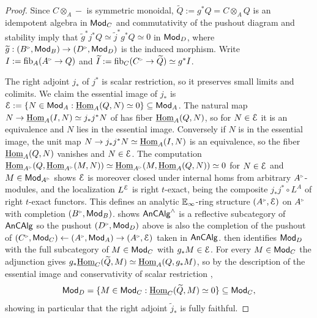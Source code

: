 \begin{proof}
    Since $C\otimes_{A}-$ is symmetric monoidal, $\widetilde{Q}:=g^{*}Q=C\otimes_{A}Q$ is an idempotent algebra in $\mathsf{Mod}_{C}$ and commutativity of the pushout diagram and stability imply that $\widetilde{g}^{*}j^{*}Q\simeq\widetilde{j}^{*}g^{*}Q\simeq0$ in $\mathsf{Mod}_{D}$, where $\widetilde{g}:(B^{\tri},\Mod_{B})\to(D^{\tri},\Mod_{D})$ is the induced morphism. Write $I:=\fib_{A}(A^{\tri}\to Q)$ and $\widetilde{I}:=\fib_{C}(C^{\tri}\to\widetilde{Q})\simeq g^{*}I$.

    The right adjoint $j_{*}$ of $j^{*}$ is scalar restriction, so it preserves small limits and colimits. We claim the essential image of $j_{*}$ is $\EuScript{E}:=\{N\in\mathsf{Mod}_{A}:\underline{\mathrm{Hom}}_{A}(Q,N)\simeq0\}\subseteq\mathsf{Mod}_{A}$. The natural map $N\to\underline{\mathrm{Hom}}_{A}(I,N)\simeq j_{*}j^{*}N$ of \cite[Rmk. 5.1.5 (2)]{CamargoSolid} has fiber $\underline{\mathrm{Hom}}_{A}(Q,N)$, so for $N\in\EuScript{E}$ it is an equivalence and $N$ lies in the essential image. Conversely if $N$ is in the essential image, the unit map $N\to j_{*}j^{*}N\simeq\underline{\mathrm{Hom}}_{A}(I,N)$ is an equivalence, so the fiber $\underline{\mathrm{Hom}}_{A}(Q,N)$ vanishes and $N\in\EuScript{E}$. The computation $\intHom_{A^{\tri}}(Q,\intHom_{A^{\tri}}(M,N))\simeq\intHom_{A^{\tri}}(M,\intHom_{A}(Q,N))\simeq0$ for $N\in\EuScript{E}$ and $M\in\Mod_{A^{\tri}}$ shows $\EuScript{E}$ is moreover closed under internal homs from arbitrary $A^{\tri}$-modules, and the localization $L^{\EuScript{E}}$ is right $t$-exact, being the composite $j_{*}j^{*}\circ L^{A}$ of right $t$-exact functors. This defines an analytic $\mathbb{E}_{\infty}$-ring structure $(A^{\tri},\Escr)$ on $A^{\tri}$ with completion $(B^{\tri},\Mod_{B})$.  shows $\mathsf{An}\mathsf{CAlg}^{\wedge}$ is a reflective subcategory of $\mathsf{An}\mathsf{CAlg}$ so the pushout $(D^{\tri},\Mod_{D})$ above is also the completion of the pushout of $(C^{\tri},\Mod_{C})\leftarrow(A^{\tri},\Mod_{A})\to(A^{\tri},\Escr)$ taken in $\mathsf{An}\mathsf{CAlg}$.  then identifies $\mathsf{Mod}_{D}$ with the full subcategory of $M\in\mathsf{Mod}_{C}$ with $g_{*}M\in \EuScript{E}$. For every $M\in\mathsf{Mod}_{C}$ the adjunction gives $g_{*}\underline{\mathrm{Hom}}_{C}(\widetilde{Q},M)\simeq\underline{\mathrm{Hom}}_{A}(Q,g_{*}M)$, so by the description of the essential image and conservativity of scalar restriction \cite[Cor. 4.2.3.2]{HA},
    $$\mathsf{Mod}_{D}=\{M\in\mathsf{Mod}_{C}:\underline{\mathrm{Hom}}_{C}(\widetilde{Q},M)\simeq0\}\subseteq\mathsf{Mod}_{C},$$
    showing in particular that the right adjoint $\widetilde{j}_{*}$ is fully faithful.



\end{proof}
